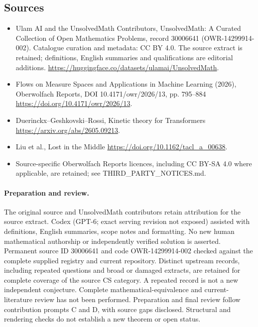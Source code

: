 \documentclass[11pt]{article}
\begin{document}
\subsection{Sources}
\begin{itemize}
\item[\hypertarget{source:30006641:1}{S1}] Ulam AI and the UnsolvedMath Contributors, UnsolvedMath: A Curated Collection of Open Mathematics Problems, record 30006641 (OWR-14299914-002). Catalogue curation and metadata: CC BY 4.0. The source extract is retained; definitions, English summaries and qualifications are editorial additions.
\url{https://huggingface.co/datasets/ulamai/UnsolvedMath}.
\item[\hypertarget{source:30006641:2}{S2}] Flows on Measure Spaces and Applications in Machine Learning (2026), Oberwolfach Reports, DOI 10.4171/owr/2026/13, pp. 795--884
\url{https://doi.org/10.4171/owr/2026/13}.
\item[\hypertarget{source:30006641:3}{S3}] Duerinckx--Geshkovski--Rossi, Kinetic theory for Transformers
\url{https://arxiv.org/abs/2605.09213}.
\item[\hypertarget{source:30006641:4}{S4}] Liu et al., Lost in the Middle
\url{https://doi.org/10.1162/tacl_a_00638}.
\item Source-specific Oberwolfach Reports licences, including CC BY-SA 4.0 where applicable, are retained; see THIRD\_PARTY\_NOTICES.md.
\end{itemize}
\paragraph{Preparation and review.}
The original source and UnsolvedMath contributors retain attribution for the source extract. Codex (GPT-6; exact serving revision not exposed) assisted with definitions, English summaries, scope notes and formatting. No new human mathematical authorship or independently verified solution is asserted. Permanent source ID 30006641 and code OWR-14299914-002 checked against the complete supplied registry and current repository. Distinct upstream records, including repeated questions and broad or damaged extracts, are retained for complete coverage of the source CS category. A repeated record is not a new independent conjecture. Complete mathematical-equivalence and current-literature review has not been performed. Preparation and final review follow contribution prompts C and D, with source gaps disclosed. Structural and rendering checks do not establish a new theorem or open status.
\label{end:30006641}
\end{document}
